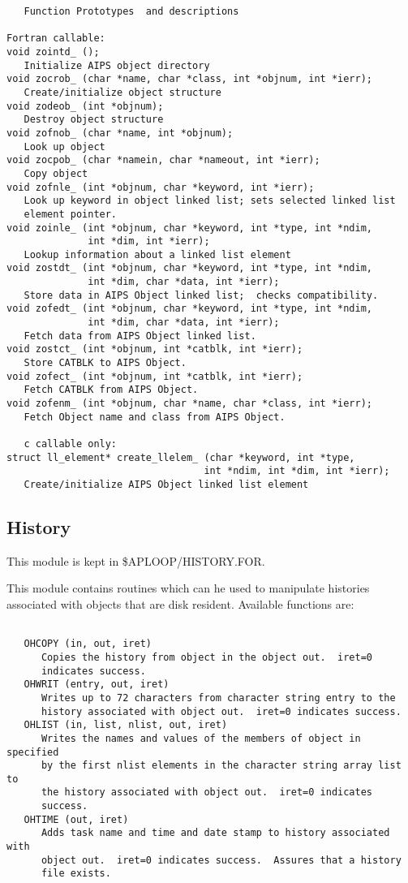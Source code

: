 {\begin{verbatim}
   Function Prototypes  and descriptions

Fortran callable:
void zointd_ ();
   Initialize AIPS object directory
void zocrob_ (char *name, char *class, int *objnum, int *ierr);
   Create/initialize object structure
void zodeob_ (int *objnum);
   Destroy object structure
void zofnob_ (char *name, int *objnum);
   Look up object
void zocpob_ (char *namein, char *nameout, int *ierr);
   Copy object
void zofnle_ (int *objnum, char *keyword, int *ierr);
   Look up keyword in object linked list; sets selected linked list
   element pointer.
void zoinle_ (int *objnum, char *keyword, int *type, int *ndim,
              int *dim, int *ierr);
   Lookup information about a linked list element
void zostdt_ (int *objnum, char *keyword, int *type, int *ndim,
              int *dim, char *data, int *ierr);
   Store data in AIPS Object linked list;  checks compatibility.
void zofedt_ (int *objnum, char *keyword, int *type, int *ndim,
              int *dim, char *data, int *ierr);
   Fetch data from AIPS Object linked list.
void zostct_ (int *objnum, int *catblk, int *ierr);
   Store CATBLK to AIPS Object.
void zofect_ (int *objnum, int *catblk, int *ierr);
   Fetch CATBLK from AIPS Object.
void zofenm_ (int *objnum, char *name, char *class, int *ierr);
   Fetch Object name and class from AIPS Object.

   c callable only:
struct ll_element* create_llelem_ (char *keyword, int *type,
                                  int *ndim, int *dim, int *ierr);
   Create/initialize AIPS Object linked list element
\end{verbatim}}

\subsection{History}

   This module is kept in \$APLOOP/HISTORY.FOR.

This module contains routines which can he used to manipulate
histories associated with objects that are disk resident.
Available functions are:
{\small\begin{verbatim}

   OHCOPY (in, out, iret)
      Copies the history from object in the object out.  iret=0
      indicates success.
   OHWRIT (entry, out, iret)
      Writes up to 72 characters from character string entry to the
      history associated with object out.  iret=0 indicates success.
   OHLIST (in, list, nlist, out, iret)
      Writes the names and values of the members of object in specified
      by the first nlist elements in the character string array list to
      the history associated with object out.  iret=0 indicates
      success.
   OHTIME (out, iret)
      Adds task name and time and date stamp to history associated with
      object out.  iret=0 indicates success.  Assures that a history
      file exists.

\end{verbatim}}

